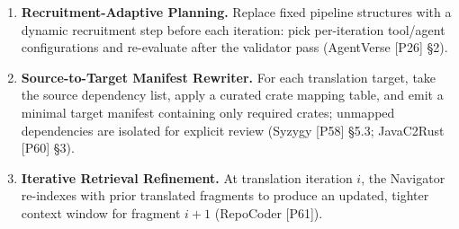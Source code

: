\begin{enumerate}
\item \textbf{Recruitment-Adaptive Planning.}
Replace fixed pipeline structures with a dynamic recruitment step before each iteration: pick per-iteration tool/agent configurations and re-evaluate after the validator pass (AgentVerse [P26] \S2).

\item \textbf{Source-to-Target Manifest Rewriter.}
For each translation target, take the source dependency list, apply a curated crate mapping table, and emit a minimal target manifest containing only required crates; unmapped dependencies are isolated for explicit review (Syzygy [P58] \S5.3; JavaC2Rust [P60] \S3).

\item \textbf{Iterative Retrieval Refinement.}
At translation iteration $i$, the Navigator re-indexes with prior translated fragments to produce an updated, tighter context window for fragment $i+1$ (RepoCoder [P61]).

\end{enumerate}

